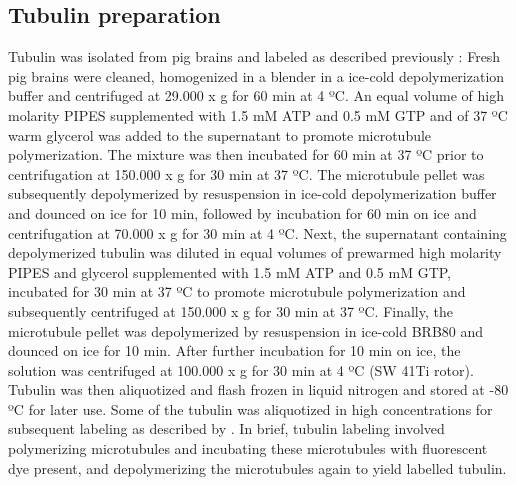 \subsection{Tubulin preparation}
Tubulin was isolated from pig brains and labeled as described previously \parencite{CASTOLDI200383}: Fresh pig brains were cleaned, homogenized in a blender in a ice-cold depolymerization buffer and centrifuged at 29.000 x g for 60 min at 4 ºC. An equal volume of high molarity PIPES supplemented with 1.5 mM ATP and 0.5 mM GTP and of 37 ºC warm glycerol was added to the supernatant to promote microtubule polymerization. The mixture was then incubated for 60 min at 37 ºC prior to centrifugation at 150.000 x g for 30 min at 37 ºC. The microtubule pellet was subsequently depolymerized by resuspension in ice-cold depolymerization buffer and dounced on ice for 10 min, followed by incubation for 60 min on ice and centrifugation at 70.000 x g for 30 min at 4 ºC. Next, the supernatant containing depolymerized tubulin was diluted in equal volumes of prewarmed high molarity PIPES and glycerol supplemented with 1.5 mM ATP and 0.5 mM GTP, incubated for 30 min at 37 ºC to promote microtubule polymerization and subsequently centrifuged at 150.000 x g for 30 min at 37 ºC. Finally, the microtubule pellet was depolymerized by resuspension in ice-cold BRB80 and dounced on ice for 10 min. After further incubation for 10 min on ice, the solution was centrifuged at 100.000 x g for 30 min at 4 ºC (SW 41Ti rotor). Tubulin was then aliquotized and flash frozen in liquid nitrogen and stored at -80 ºC for later use. Some of the tubulin was aliquotized in high concentrations for subsequent labeling as described by \cite{HYMAN1991478}. In brief, tubulin labeling involved polymerizing microtubules and incubating these microtubules with fluorescent dye present, and depolymerizing the microtubules again to yield labelled tubulin.
